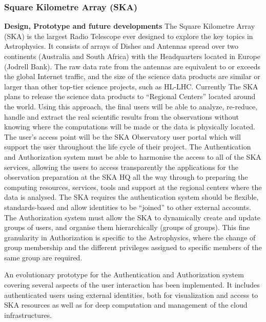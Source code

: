 \documentclass[fleqn,11pt]{wlscirep}
\begin{document}
{\subsubsection{Square Kilometre Array (SKA)}
\textbf{Design, Prototype and future developments}
The Square Kilometre Array (SKA) is the largest Radio Telescope ever designed to explore the key  topics in Astrophysics. It consists of arrays of Dishes and Antennas spread over two continents (Australia and South Africa) with the Headquarters located in Europe (Jodrell Bank). The  raw data rate from the antennas are equivalent to or exceeds the global Internet traffic, and the size of the science data products are similar or larger than other top-tier science projects, such as HL-LHC.  Currently The SKA plans to release the science data products to “Regional Centers” located around the world. Using this approach, the final users will be able to analyze, re-reduce, handle and extract the real scientific results from the observations without knowing where the computations will be made or the data is physically located. The user’s access point will be the SKA Observatory user portal which will support the user throughout the life cycle of their project.  The Authentication and Authorization system must be able to harmonise the access to all of the SKA services, allowing the users  to access transparently the applications for the observation preparation at the SKA HQ all the way through to preparing the computing resources, services, tools and support at the regional centers where the data is analysed. The SKA requires  the authentication system should be flexible, standards-based and allow identities to be  “joined” to other external accounts. The Authorization system must allow the SKA to dynamically create and update groups of users, and organise them  hierarchically  (groups of groups). This fine granularity in Authorization is specific to the Astrophysics, where the change of group membership and the different privileges assigned to specific members of the same group are required. 

An evolutionary prototype for the Authentication and Authorization system covering several aspects of the user interaction has been implemented. It includes authenticated users using external identities, both for visualization and access to SKA resources as well as for deep computation and management of the cloud infrastructures. 

}
\end{document}
